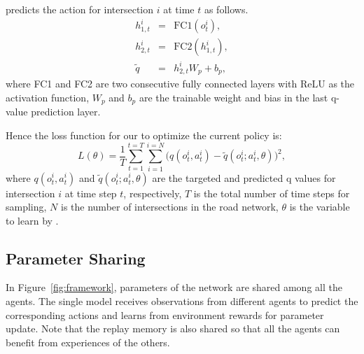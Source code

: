 \PressLight predicts the action for intersection $i$ at time $t$ as follows.
\begin{eqnarray}
h^i_{1,t}&=&\text{FC1}(o^i_t),\\
h^i_{2,t}&=&\text{FC2}(h^i_{1,t}),\\
\widetilde{q}&=&h^i_{2,t}W_p+b_p,
\end{eqnarray}
where FC1 and FC2 are two consecutive fully connected layers with ReLU as the activation function, $W_p$ and $b_p$ are the trainable weight and bias in the last q-value prediction layer.

Hence the loss function for our \PressLight to optimize the current policy is:
\begin{equation}
L(\theta)=\frac{1}{T}\sum_{t=1}^{t=T}\sum_{i=1}^{i=N}\big(q(o^i_t,a^i_t)-\widetilde{q}(o^i_t;a^i_t,\theta)\big)^2,
\end{equation}
where $q(o^i_t,a^i_t)$ and $\widetilde{q}(o^i_t;a^i_t,\theta)$ are the targeted and predicted q values for intersection $i$ at time step $t$, respectively, $T$ is the total number of time steps for sampling, $N$ is the number of intersections in the road network, $\theta$ is the variable to learn by \PressLight.


\subsection{Parameter Sharing} 
In Figure~\ref{fig:framework}, parameters of the network are shared among all the agents. The single \PressLight model receives observations from different agents to predict the corresponding actions and learns from environment rewards for parameter update. Note that the replay memory is also shared so that all the agents can benefit from experiences of the others.







